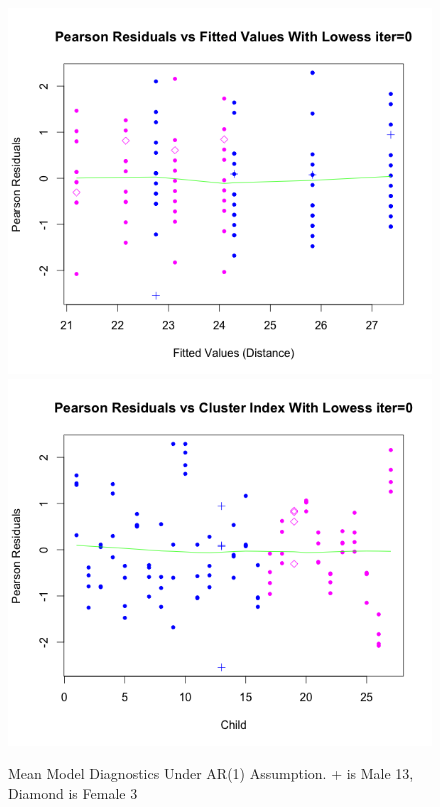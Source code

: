 \documentclass[11pt]{article}
\begin{document}
\begin{enumerate}
		\begin{figure}[H]
			\includegraphics[scale=0.4]{RplotAR1Mean1}
			\includegraphics[scale=0.4]{RplotAR1Mean2}
			\caption{Mean Model Diagnostics Under AR(1) Assumption. + is Male 13, Diamond is Female 3}
		\end{figure}


\end{enumerate}
\end{document}
